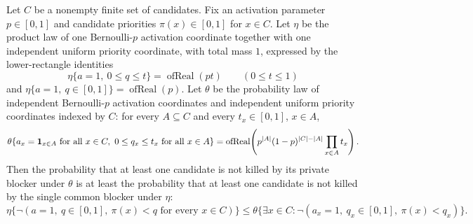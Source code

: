 \begin{helper}
Let \(C\) be a nonempty finite set of candidates.  Fix an activation
parameter \(p\in[0,1]\) and candidate priorities \(\pi(x)\in[0,1]\) for
\(x\in C\).  Let \(\eta\) be the product law of one Bernoulli-\(p\)
activation coordinate together with one independent uniform priority
coordinate, with total mass \(1\), expressed by the lower-rectangle identities
\[
\eta\{a=1,\ 0\le q\le t\}=\operatorname{ofReal}(pt)
\qquad(0\le t\le1)
\]
and \(\eta\{a=1,\ q\in[0,1]\}=\operatorname{ofReal}(p)\).
Let \(\theta\) be the probability law of independent Bernoulli-\(p\)
activation coordinates and independent uniform priority coordinates indexed by
\(C\):
for every \(A\subseteq C\) and every \(t_x\in[0,1]\), \(x\in A\),
\[
\theta\{a_x={\bf 1}_{x\in A}\text{ for all }x\in C,\ 
       0\le q_x\le t_x\text{ for all }x\in A\}
=\operatorname{ofReal}\!\left(
  p^{|A|}(1-p)^{|C|-|A|}\prod_{x\in A}t_x\right).
\]
Then the probability that at least one candidate is not killed by its private
blocker under \(\theta\) is at least the probability that at least one
candidate is not killed by the single common blocker under \(\eta\):
\[
\eta\{\neg(a=1,\ q\in[0,1],\ \pi(x)<q\text{ for every }x\in C)\}
\le
\theta\{\exists x\in C:\neg(a_x=1,\ q_x\in[0,1],\ \pi(x)<q_x)\}.
\]
\end{helper}
